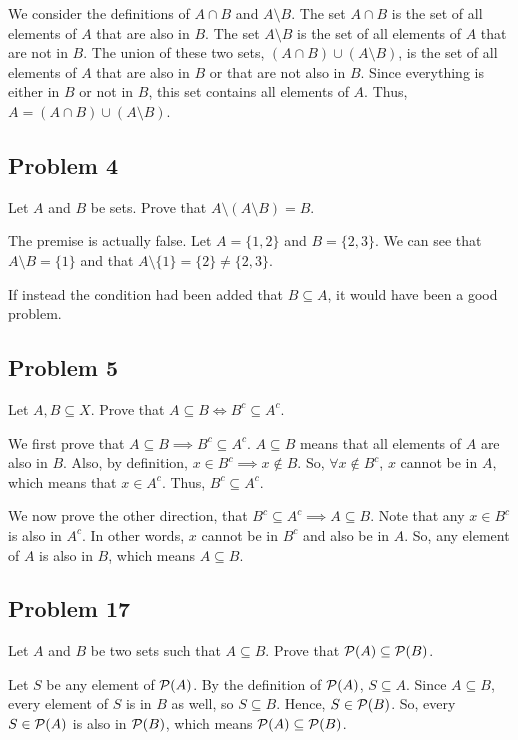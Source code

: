 \documentclass[11pt]{article}
\renewcommand{\P}{{\cal P}}
\begin{document}
We consider the definitions of $A \cap B$ and $A \setminus B$. The set $A \cap B$
is the set of all elements of $A$ that are also in $B$. The set $A \setminus B$ is the
set of all elements of $A$ that are not in $B$. The union of these two sets,
$(A \cap B) \cup (A \setminus B)$, is the set of all elements of $A$ that are also
in $B$ or that are not also in $B$. Since everything is either in $B$ or not in $B$,
this set contains all elements of $A$. Thus, $A = (A \cap B) \cup (A \setminus B)$. 

\subsection*{Problem 4}

Let $A$ and $B$ be sets. Prove that $A \setminus (A \setminus B) = B$.

The premise is actually false. Let $A = \{1, 2\}$ and $B = \{2, 3\}$. We can see that
$A \setminus B = \{1\}$ and that $A \setminus \{1\} = \{2\} \neq \{2, 3\}$.

If instead the condition had been added that $B \subseteq A$, it would have been a good
problem.

\subsection*{Problem 5}

Let $A, B \subseteq X$. Prove that $A \subseteq B \iff B^c \subseteq A^c$.

We first prove that $A \subseteq B \implies B^c \subseteq A^c$. $A \subseteq B$ means that
all elements of $A$ are also in $B$. Also, by definition, $x \in B^c \implies x \notin B$. 
So, $\forall x \notin B^c$, $x$ cannot be in $A$, which means that $x \in A^c$. Thus, 
$B^c \subseteq A^c$. 

We now prove the other direction, that $B^c \subseteq A^c \implies A \subseteq B$.
Note that any $x \in B^c$ is also in $A^c$. In other words, $x$ cannot be in $B^c$ and
also be in $A$. So, any element of $A$ is also in $B$, which means $A \subseteq B$.

\subsection*{Problem 17}

Let $A$ and $B$ be two sets such that $A \subseteq B$. Prove that $\P (A) \subseteq \P (B)$.

Let $S$ be any element of $\P (A)$. By the definition of $\P (A)$, $S \subseteq A$.
Since $A \subseteq B$, every element of $S$ is in $B$ as well, so $S \subseteq B$.
Hence, $S \in \P (B)$. So, every $S \in \P (A)$ is also in $\P (B)$, which means
$\P (A) \subseteq \P (B)$. 
\end{document}
